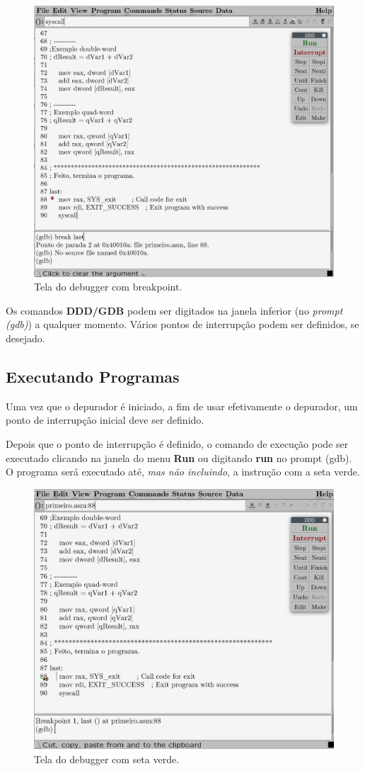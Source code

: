 \begin{figure}[h]
	\begin{center}
		\includegraphics[width=0.8\linewidth]{imagens/dddbreakpoint}
	\end{center}
	\caption{Tela do debugger com breakpoint.}
\end{figure}

Os comandos \textbf{DDD/GDB} podem ser digitados na janela inferior (no \textit{prompt (gdb)}) a qualquer momento. Vários pontos de interrupção podem ser definidos, se desejado.

\subsection{Executando Programas}
Uma vez que o depurador é iniciado, a fim de usar efetivamente o depurador, um ponto de interrupção inicial deve ser definido.

Depois que o ponto de interrupção é definido, o comando de execução pode ser executado clicando na janela do menu \textbf{Run} ou digitando \textbf{run} no prompt (gdb). O programa será executado até, \textit{mas não incluindo}, a instrução com a seta verde.

\begin{figure}[h]
	\begin{center}
		\includegraphics[width=0.8\linewidth]{imagens/ddd03}
	\end{center}
	\caption{Tela do debugger com seta verde.}
\end{figure}

